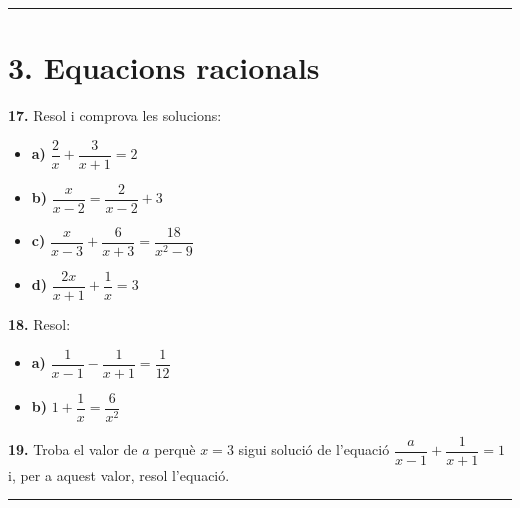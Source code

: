 \documentclass[13pt,a4paper]{extarticle}
\begin{document}
\vspace{1mm}\hrule\vspace{3mm}

\section*{3. Equacions racionals}

\par\noindent\begin{minipage}{\linewidth}
\textbf{17.} Resol i comprova les solucions:\par

\begin{itemize}[leftmargin=0pt,itemsep=6pt,topsep=4pt,parsep=0pt,label={}]
\item \textbf{a)} $\dfrac{2}{x}+\dfrac{3}{x+1}=2$
\item \textbf{b)} $\dfrac{x}{x-2}=\dfrac{2}{x-2}+3$
\item \textbf{c)} $\dfrac{x}{x-3}+\dfrac{6}{x+3}=\dfrac{18}{x^2-9}$
\item \textbf{d)} $\dfrac{2x}{x+1}+\dfrac{1}{x}=3$
\end{itemize}
\end{minipage}\par\vspace{1.6mm}
\par\noindent\begin{minipage}{\linewidth}
\textbf{18.} Resol:\par

\begin{itemize}[leftmargin=0pt,itemsep=6pt,topsep=4pt,parsep=0pt,label={}]
\item \textbf{a)} $\dfrac{1}{x-1}-\dfrac{1}{x+1}=\dfrac{1}{12}$
\item \textbf{b)} $1+\dfrac{1}{x}=\dfrac{6}{x^2}$
\end{itemize}
\end{minipage}\par\vspace{1.6mm}
\par\noindent\begin{minipage}{\linewidth}
\textbf{19.} Troba el valor de $a$ perquè $x=3$ sigui solució de l'equació $\dfrac{a}{x-1}+\dfrac{1}{x+1}=1$ i, per a aquest valor, resol l'equació.\par
\end{minipage}\par\vspace{1.6mm}

\vspace{1mm}\hrule\vspace{3mm}
\end{document}
